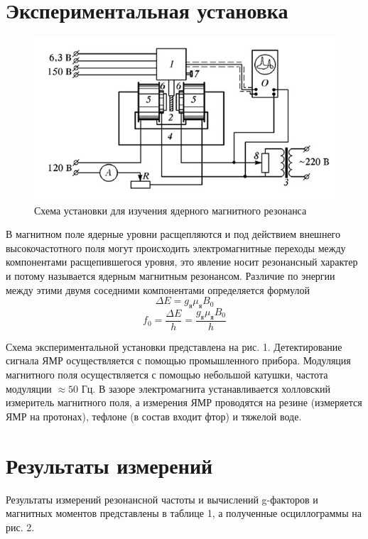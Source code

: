 \documentclass[a4paper,12pt]{article} %
\begin{document}
\section{Экспериментальная установка}
\begin{figure}[h]
\begin{center}
\includegraphics[width = \textwidth]{1.jpg}
\caption{Схема установки для изучения ядерного магнитного резонанса}
\end{center}
\end{figure}
В магнитном поле ядерные уровни расщепляются и под действием внешнего высокочастотного поля могут происходить электромагнитные переходы между компонентами расщепившегося уровня, это явление носит резонансный характер и потому называется ядерным магнитным резонансом. Различие по энергии между этими двумя соседними компонентами определяется формулой
\[\Delta E = g_{\text{я}}\mu_{\text{я}}B_0\]
\[f_0 = \frac{\Delta E }{h} = \frac{g_{\text{я}}\mu_{\text{я}}B_0}{h}\]

Схема экспериментальной установки представлена на рис. 1. Детектирование сигнала ЯМР осуществляется с помощью промышленного прибора. Модуляция магнитного поля осуществляется с помощью небольшой катушки, частота модуляции $\approx 50$ Гц. В зазоре электромагнита устанавливается холловский измеритель магнитного поля, а измерения ЯМР проводятся на резине (измеряется ЯМР на протонах), тефлоне (в состав входит фтор) и тяжелой воде.


\section{Результаты измерений}

Результаты измерений резонансной частоты и вычислений g-факторов и магнитных моментов представлены в таблице 1, а полученные осциллограммы на рис. 2.
\end{document}
